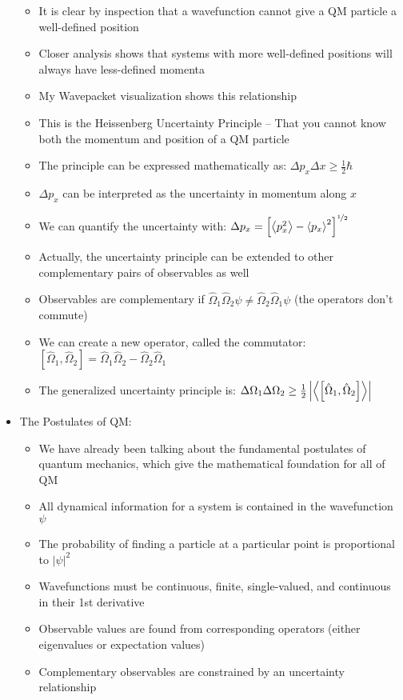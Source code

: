 \documentclass[12pt, openany, letterpaper]{memoir}
\begin{document}
\begin{itemize}
	\begin{itemize}
		\item It is clear by inspection that a wavefunction cannot give a QM particle a well-defined position
		\item Closer analysis shows that systems with more well-defined positions will always have less-defined momenta
		\item My Wavepacket visualization shows this relationship
		\item This is the Heissenberg Uncertainty Principle -- That you cannot know both the momentum and position of a QM particle
		\item The principle can be expressed mathematically as: $\Delta p_x\Delta x \geq \frac{1}{2}\hbar$
		\item $\Delta p_x$ can be interpreted as the uncertainty in momentum along $x$
		\item We can quantify the uncertainty with: $\Delta p_x = \left[\left< p_x^2 \right>-\left< p_x \right>^2\right]^{\nicefrac{1}{2}}$
		\item Actually, the uncertainty principle can be extended to other complementary pairs of observables as well
		\item Observables are complementary if $\hat{\Omega}_1\hat{\Omega}_2\psi\neq\hat{\Omega}_2\hat{\Omega}_1\psi$ (the operators don't commute)
		\item We can create a new operator, called the commutator: $\left[\hat{\Omega}_1,\hat{\Omega}_2\right]=\hat{\Omega}_1\hat{\Omega}_2-\hat{\Omega}_2\hat{\Omega}_1$
		\item The generalized uncertainty principle is: $\Delta\Omega_1\Delta\Omega_2\geq\frac{1}{2}\left|\left< \left[\hat{\Omega}_1,\hat{\Omega}_2\right] \right>\right|$
	\end{itemize}
	\item The Postulates of QM:
	\begin{itemize}
		\item We have already been talking about the fundamental postulates of quantum mechanics, which give the mathematical foundation for all of QM 
	\end{itemize}
	\begin{itemize}
		\item All dynamical information for a system is contained in the wavefunction $\psi$
		\item The probability of finding a particle at a particular point is proportional to $\left|\psi\right|^2$
		\item Wavefunctions must be continuous, finite, single-valued, and continuous in their 1st derivative
		\item Observable values are found from corresponding operators (either eigenvalues or expectation values)
		\item Complementary observables are constrained by an uncertainty relationship
	\end{itemize}
\end{itemize}
\end{document}
